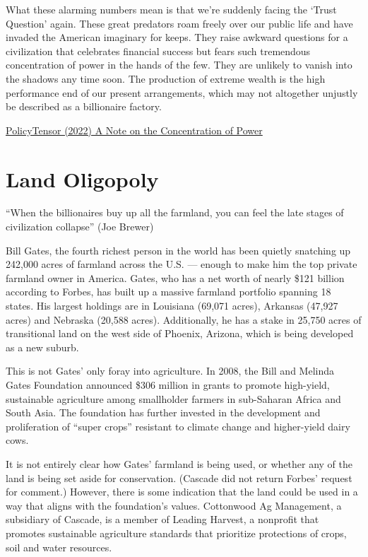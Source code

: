\documentclass[
]{book}
\begin{document}
What these alarming numbers mean is that we're suddenly facing the `Trust Question' again. These great predators roam freely over our public life and have invaded the American imaginary for keeps. They raise awkward questions for a civilization that celebrates financial success but fears such tremendous concentration of power in the hands of the few. They are unlikely to vanish into the shadows any time soon. The production of extreme wealth is the high performance end of our present arrangements, which may not altogether unjustly be described as a billionaire factory.

\href{https://policytensor.substack.com/p/a-note-on-the-concentration-of-power}{PolicyTensor (2022) A Note on the Concentration of Power}

\hypertarget{land-oligopoly}{%
\section{Land Oligopoly}\label{land-oligopoly}}

``When the billionaires buy up all the farmland,
you can feel the late stages of civilization collapse'' (Joe Brewer)

Bill Gates, the fourth richest person in the world has been quietly
snatching up 242,000 acres of farmland across the U.S. ---
enough to make him the top private farmland owner in America.
Gates, who has a net worth of nearly \$121 billion according to Forbes,
has built up a massive farmland portfolio spanning 18 states.
His largest holdings are in Louisiana (69,071 acres), Arkansas (47,927 acres)
and Nebraska (20,588 acres).
Additionally, he has a stake in 25,750 acres of transitional land
on the west side of Phoenix, Arizona, which is being developed as a new suburb.

This is not Gates' only foray into agriculture.
In 2008, the Bill and Melinda Gates Foundation announced
\$306 million in grants to promote high-yield, sustainable agriculture
among smallholder farmers in sub-Saharan Africa and South Asia.
The foundation has further invested in the development and
proliferation of ``super crops'' resistant to climate change
and higher-yield dairy cows.

It is not entirely clear how Gates' farmland is being used,
or whether any of the land is being set aside for conservation.
(Cascade did not return Forbes' request for comment.)
However, there is some indication that the land could be used
in a way that aligns with the foundation's values.
Cottonwood Ag Management, a subsidiary of Cascade,
is a member of Leading Harvest, a nonprofit that promotes
sustainable agriculture standards that prioritize protections
of crops, soil and water resources.
\end{document}
